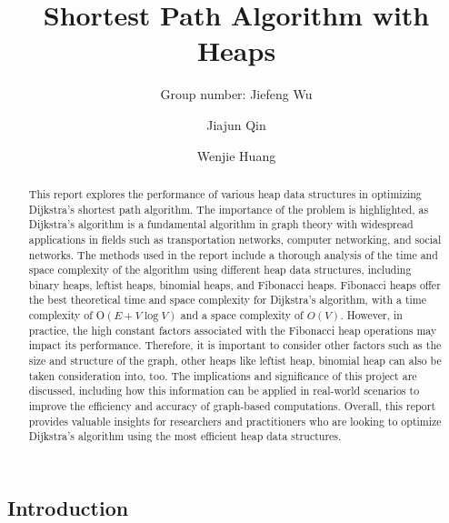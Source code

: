 \documentclass[twoside]{article}
\begin{document}
\begin{CJK*}{UTF8}{gbsn}
\title{Shortest Path Algorithm with Heaps}
\author{Group number: Jiefeng Wu \and Jiajun Qin \and Wenjie Huang}
\maketitle

\begin{abstract}
This report explores the performance of various heap data structures in optimizing Dijkstra's shortest path algorithm.  The importance of the problem is highlighted, as Dijkstra's algorithm is a fundamental algorithm in graph theory with widespread applications in fields such as transportation networks, computer networking, and social networks.  The methods used in the report include a thorough analysis of the time and space complexity of the algorithm using different heap data structures, including binary heaps, leftist heaps, binomial heaps, and Fibonacci heaps.  Fibonacci heaps offer the best theoretical time and space complexity for Dijkstra's algorithm, with a time complexity of O$(E + V \log V)$ and a space complexity of $O(V)$.  However, in practice, the high constant factors associated with the Fibonacci heap operations may impact its performance.  Therefore, it is important to consider other factors such as the size and structure of the graph, other heaps like leftist heap, binomial heap can also be taken consideration into, too. The implications and significance of this project are discussed, including how this information can be applied in real-world scenarios to improve the efficiency and accuracy of graph-based computations.  Overall, this report provides valuable insights for researchers and practitioners who are looking to optimize Dijkstra's algorithm using the most efficient heap data structures.
\end{abstract}

\section{Introduction}


\end{CJK*}
\end{document}
